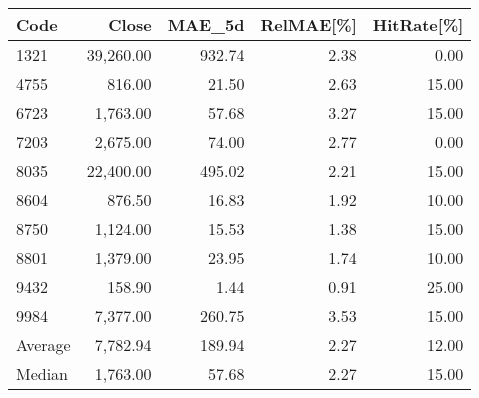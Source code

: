 \begingroup
\footnotesize
\begin{tabular}{lrrrr}
\hline
Code & Close & MAE\_5d & RelMAE[\%] & HitRate[\%] \\
\hline
1321 & 39,260.00 & 932.74 & 2.38 & 0.00 \\
4755 & 816.00 & 21.50 & 2.63 & 15.00 \\
6723 & 1,763.00 & 57.68 & 3.27 & 15.00 \\
7203 & 2,675.00 & 74.00 & 2.77 & 0.00 \\
8035 & 22,400.00 & 495.02 & 2.21 & 15.00 \\
8604 & 876.50 & 16.83 & 1.92 & 10.00 \\
8750 & 1,124.00 & 15.53 & 1.38 & 15.00 \\
8801 & 1,379.00 & 23.95 & 1.74 & 10.00 \\
9432 & 158.90 & 1.44 & 0.91 & 25.00 \\
9984 & 7,377.00 & 260.75 & 3.53 & 15.00 \\
Average & 7,782.94 & 189.94 & 2.27 & 12.00 \\
Median & 1,763.00 & 57.68 & 2.27 & 15.00 \\
\hline
\end{tabular}
\endgroup